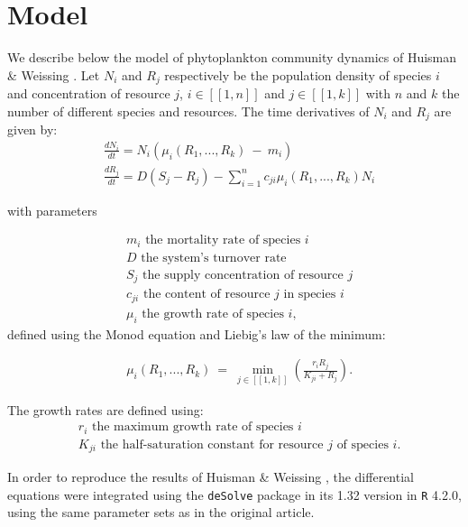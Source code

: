 \section{Model}

We describe below the model of phytoplankton community dynamics of Huisman \& Weissing \cite{1999:Huisman}. Let $N_i$ and $R_j$ respectively be the population density of species $i$ and concentration of resource $j$, $i\in[\![1,n]\!]$ and $j\in[\![1,k]\!]$ with $n$ and $k$ the number of different species and resources. The time derivatives of $N_i$ and $R_j$ are given by: \\

\begin{align}
	& \frac{dN_i}{dt}= N_i(\mu_i(R_1,...,R_k)~-~m_i)\\
	& \frac{dR_j}{dt}= D(S_j-R_j) - \sum_{i=1}^n c_{ji} 
\mu_i(R_1,...,R_k)N_i
\end{align}

with parameters

\begin{align*}
& m_i \text{ the mortality rate of species $i$}\\
& D \text{ the system's turnover rate}\\
& S_j \text{ the supply concentration of resource $j$}\\
& c_{ji} \text{ the content of resource $j$ in species $i$}\\
& \mu_i \text{ the growth rate of species $i$,}
\end{align*}
defined using the Monod equation and Liebig's law of the minimum:

\begin{align}
&\mu_i(R_1,...,R_k)~=~\min_{j\in[\![1,k]\!]} \left( \frac{r_iR_j}{K_{ji}+R_j} \right). 
\end{align}

The growth rates are defined using: 
\begin{align*}
&r_i \text{ the maximum growth rate of species $i$}\\
&K_{	ji} \text{ the half-saturation constant for resource $j$ of species $i$.}
\end{align*}

In order to reproduce the results of Huisman \& Weissing \cite{1999:Huisman}, the differential equations were integrated using the \texttt{deSolve} \cite{deSolve} package in its 1.32 version in \texttt{R} \cite{R} 4.2.0, using the same parameter sets as in the original article.\\

